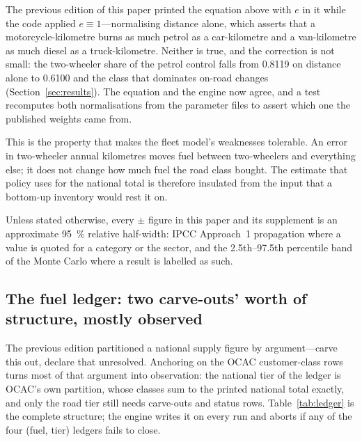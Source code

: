 The previous edition of this paper printed the equation above with $e$ in it while the
code applied $e \equiv 1$---normalising distance alone, which asserts that a
motorcycle-kilometre burns as much petrol as a car-kilometre and a van-kilometre as much
diesel as a truck-kilometre. Neither is true, and the correction is not small: the
two-wheeler share of the petrol control falls from 0.8119 on distance alone to 0.6100 and the class that
dominates on-road \COtwo{} changes (Section~\ref{sec:results}). The equation and the
engine now agree, and a test recomputes both normalisations from the parameter files to
assert which one the published weights came from.

This is the property that makes the fleet model's weaknesses tolerable. An error in
two-wheeler annual kilometres moves fuel between two-wheelers and everything else; it does not
change how much fuel the road class bought. The estimate that policy uses for the national
total is therefore insulated from the input that a bottom-up inventory would rest it on.

Unless stated otherwise, every $\pm$ figure in this paper and its supplement is an
approximate \SI{95}{\percent} relative half-width: IPCC Approach~1 propagation where a
value is quoted for a category or the sector, and the 2.5th--97.5th percentile band of
the Monte Carlo where a result is labelled as such.

\subsection{The fuel ledger: two carve-outs' worth of structure, mostly observed}
\label{sec:ledger}

The previous edition partitioned a national supply figure by argument---carve this out,
declare that unresolved. Anchoring on the OCAC customer-class rows turns most of that
argument into observation: the national tier of the ledger is OCAC's own partition, whose
classes sum to the printed national total exactly, and only the road tier still needs
carve-outs and status rows. Table~\ref{tab:ledger} is the complete structure; the engine
writes it on every run and aborts if any of the four (fuel, tier) ledgers fails to close.


